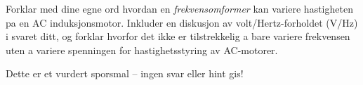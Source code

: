 

Forklar med dine egne ord hvordan en {\it frekvensomformer} kan variere hastigheten pa en AC induksjonsmotor.  Inkluder en diskusjon av volt/Hertz-forholdet (V/Hz) i svaret ditt, og forklar hvorfor det ikke er tilstrekkelig a bare variere frekvensen uten a variere spenningen for hastighetsstyring av AC-motorer.

\vfil

\eject






Dette er et vurdert sporsmal -- ingen svar eller hint gis!











